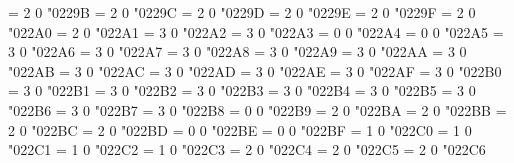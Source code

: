 \Umathchardef\circledast = 2 0 "0229B %
\Umathchardef\circledequal = 2 0 "0229C %
\Umathchardef\circleddash = 2 0 "0229D %
\Umathchardef\boxplus = 2 0 "0229E %
\Umathchardef\boxminus = 2 0 "0229F %
\Umathchardef\boxtimes = 2 0 "022A0 %
\Umathchardef\boxdot = 2 0 "022A1 %
\Umathchardef\vdash = 3 0 "022A2 %
\Umathchardef\dashv = 3 0 "022A3 %
\Umathchardef\top = 0 0 "022A4 %
\Umathchardef\bot = 0 0 "022A5 %
\Umathchardef\assert = 3 0 "022A6 %
\Umathchardef\models = 3 0 "022A7 %
\Umathchardef\vDash = 3 0 "022A8 %
\Umathchardef\Vdash = 3 0 "022A9 %
\Umathchardef\Vvdash = 3 0 "022AA %
\Umathchardef\VDash = 3 0 "022AB %
\Umathchardef\nvdash = 3 0 "022AC %
\Umathchardef\nvDash = 3 0 "022AD %
\Umathchardef\nVdash = 3 0 "022AE %
\Umathchardef\nVDash = 3 0 "022AF %
\Umathchardef\prurel = 3 0 "022B0 %
\Umathchardef\scurel = 3 0 "022B1 %
\Umathchardef\vartriangleleft = 3 0 "022B2 %
\Umathchardef\vartriangleright = 3 0 "022B3 %
\Umathchardef\trianglelefteq = 3 0 "022B4 %
\Umathchardef\trianglerighteq = 3 0 "022B5 %
\Umathchardef\origof = 3 0 "022B6 %
\Umathchardef\imageof = 3 0 "022B7 %
\Umathchardef\multimap = 3 0 "022B8 %
\Umathchardef\hermitmatrix = 0 0 "022B9 %
\Umathchardef\intercal = 2 0 "022BA %
\Umathchardef\veebar = 2 0 "022BB %
\Umathchardef\barwedge = 2 0 "022BC %
\Umathchardef\barvee = 2 0 "022BD %
\Umathchardef\measuredrightangle = 0 0 "022BE %
\Umathchardef\varlrtriangle = 0 0 "022BF %
\Umathchardef\bigwedge = 1 0 "022C0 %
\Umathchardef\bigvee = 1 0 "022C1 %
\Umathchardef\bigcap = 1 0 "022C2 %
\Umathchardef\bigcup = 1 0 "022C3 %
\Umathchardef\smwhtdiamond = 2 0 "022C4 %
\Umathchardef\cdot = 2 0 "022C5 %
\Umathchardef\star = 2 0 "022C6 %
